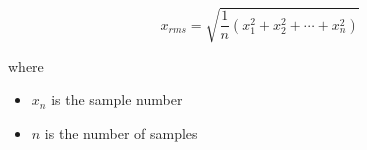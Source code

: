 \[ x_{rms} = \sqrt{\frac{1}{n}\left(x_1^2+x_2^2+\cdots+x_n^2\right)}\]

where
\begin{itemize}
\item $x_n$ is the sample number
\item $n$ is the number of samples
\end{itemize}

%
%
%
%
%
%
%
%
%


